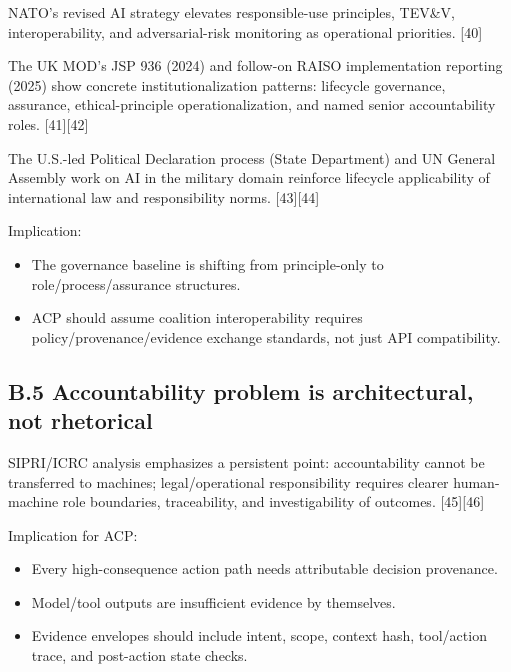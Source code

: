 \documentclass[
]{article}
\providecommand{\tightlist}{%
  \setlength{\itemsep}{0pt}\setlength{\parskip}{0pt}}
\begin{document}
NATO's revised AI strategy elevates responsible-use principles, TEV\&V,
interoperability, and adversarial-risk monitoring as operational
priorities. {[}40{]}

The UK MOD's JSP 936 (2024) and follow-on RAISO implementation reporting
(2025) show concrete institutionalization patterns: lifecycle
governance, assurance, ethical-principle operationalization, and named
senior accountability roles. {[}41{]}{[}42{]}

The U.S.-led Political Declaration process (State Department) and UN
General Assembly work on AI in the military domain reinforce lifecycle
applicability of international law and responsibility norms.
{[}43{]}{[}44{]}

Implication:

\begin{itemize}
\tightlist
\item
  The governance baseline is shifting from principle-only to
  role/process/assurance structures.
\item
  ACP should assume coalition interoperability requires
  policy/provenance/evidence exchange standards, not just API
  compatibility.
\end{itemize}

\hypertarget{b.5-accountability-problem-is-architectural-not-rhetorical}{%
\subsection{B.5 Accountability problem is architectural, not
rhetorical}\label{b.5-accountability-problem-is-architectural-not-rhetorical}}

SIPRI/ICRC analysis emphasizes a persistent point: accountability cannot
be transferred to machines; legal/operational responsibility requires
clearer human-machine role boundaries, traceability, and investigability
of outcomes. {[}45{]}{[}46{]}

Implication for ACP:

\begin{itemize}
\tightlist
\item
  Every high-consequence action path needs attributable decision
  provenance.
\item
  Model/tool outputs are insufficient evidence by themselves.
\item
  Evidence envelopes should include intent, scope, context hash,
  tool/action trace, and post-action state checks.
\end{itemize}
\end{document}
